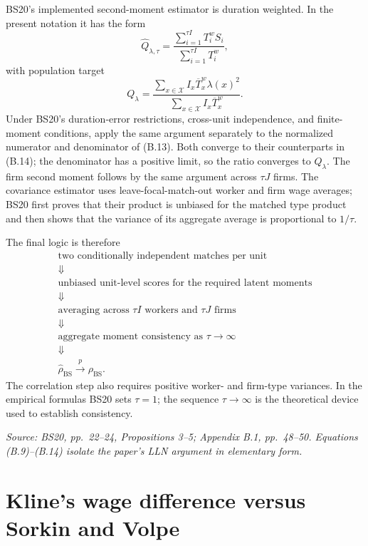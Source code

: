 \documentclass[11pt]{article}
\begin{document}
BS20's implemented second-moment estimator is duration weighted.  In the
present notation it has the form
\[
\widehat Q_{\lambda,\tau}
=
\frac{
\sum_{i=1}^{\tau I}T_i^wS_i
}{
\sum_{i=1}^{\tau I}T_i^w
},
\tag{B.13}
\]
with population target
\[
Q_\lambda
=
\frac{
\sum_{x\in\mathcal X}
I_x\overline T_x^w\lambda(x)^2
}{
\sum_{x\in\mathcal X}
I_x\overline T_x^w
}.
\tag{B.14}
\]
Under BS20's duration-error restrictions, cross-unit independence, and
finite-moment conditions, apply the same argument separately to the
normalized numerator and denominator of (B.13).  Both converge to their
counterparts in (B.14); the denominator has a positive limit, so the ratio
converges to \(Q_\lambda\).  The firm second moment follows by the same
argument across \(\tau J\) firms.  The covariance estimator uses
leave-focal-match-out worker and firm wage averages; BS20 first proves that
their product is unbiased for the matched type product and then shows that
the variance of its aggregate average is proportional to \(1/\tau\).

The final logic is therefore
\[
\begin{array}{c}
\text{two conditionally independent matches per unit}\\
\Downarrow\\
\text{unbiased unit-level scores for the required latent moments}\\
\Downarrow\\
\text{averaging across }\tau I\text{ workers and }\tau J\text{ firms}\\
\Downarrow\\
\text{aggregate moment consistency as }\tau\to\infty\\
\Downarrow\\
\widehat\rho_{\mathrm{BS}}\overset p\longrightarrow\rho_{\mathrm{BS}}.
\end{array}
\tag{B.15}
\]
The correlation step also requires positive worker- and firm-type variances.
In the empirical formulas BS20 sets \(\tau=1\); the sequence
\(\tau\to\infty\) is the theoretical device used to establish consistency.

\textit{Source: BS20, pp.\ 22--24, Propositions 3--5; Appendix B.1,
pp.\ 48--50.  Equations (B.9)--(B.14) isolate the paper's LLN argument in
elementary form.}

\section{Kline's wage difference versus Sorkin and Volpe}
\end{document}
